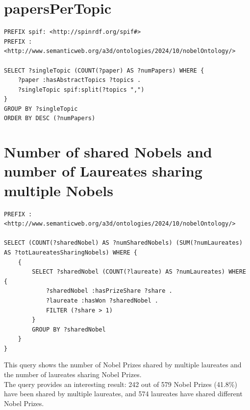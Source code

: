 \documentclass{article}
\begin{document}
\section{papersPerTopic}

\begin{lstlisting}
PREFIX spif: <http://spinrdf.org/spif#>
PREFIX : <http://www.semanticweb.org/a3d/ontologies/2024/10/nobelOntology/>

SELECT ?singleTopic (COUNT(?paper) AS ?numPapers) WHERE {
    ?paper :hasAbstractTopics ?topics .
    ?singleTopic spif:split(?topics ",")
}
GROUP BY ?singleTopic
ORDER BY DESC (?numPapers)
\end{lstlisting}

\section{Number of shared Nobels and number of Laureates sharing multiple Nobels}

\begin{lstlisting}
PREFIX : <http://www.semanticweb.org/a3d/ontologies/2024/10/nobelOntology/>

SELECT (COUNT(?sharedNobel) AS ?numSharedNobels) (SUM(?numLaureates) AS ?totLaureatesSharingNobels) WHERE {
    {
        SELECT ?sharedNobel (COUNT(?laureate) AS ?numLaureates) WHERE {
            ?sharedNobel :hasPrizeShare ?share .
            ?laureate :hasWon ?sharedNobel .
            FILTER (?share > 1)
        }
        GROUP BY ?sharedNobel
    }
}
\end{lstlisting}

This query shows the number of Nobel Prizes shared by multiple laureates
and the number of laureates sharing Nobel Prizes.\\
The query provides an interesting result: 242 out of 579 Nobel Prizes (41.8\%) have
been shared by multiple laureates, and 574 laureates have shared different Nobel Prizes.
\end{document}
